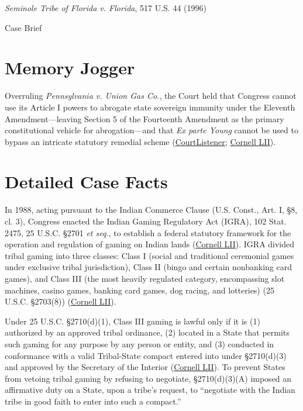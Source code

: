 \documentclass[12pt]{article}
\begin{document}
\begin{center}
{\LARGE \textit{Seminole Tribe of Florida v. Florida}, 517 U.S. 44 (1996)\par}
\vspace{0.8em}
{\large Case Brief\par}
\end{center}
\vspace{1em}

\section{Memory Jogger}

Overruling \textit{Pennsylvania v. Union Gas Co.}, the Court held that Congress cannot use its Article I powers to abrogate state sovereign immunity under the Eleventh Amendment---leaving Section 5 of the Fourteenth Amendment as the primary constitutional vehicle for abrogation---and that \textit{Ex parte Young} cannot be used to bypass an intricate statutory remedial scheme (\href{https://www.courtlistener.com/opinion/118011/seminole-tribe-of-florida-v-florida/}{CourtListener}; \href{https://www.law.cornell.edu/supct/html/94-12.ZO.html}{Cornell LII}).

\section{Detailed Case Facts}

In 1988, acting pursuant to the Indian Commerce Clause (U.S. Const., Art. I, \S 8, cl. 3), Congress enacted the Indian Gaming Regulatory Act (IGRA), 102 Stat. 2475, 25 U.S.C. \S 2701 \textit{et seq.}, to establish a federal statutory framework for the operation and regulation of gaming on Indian lands (\href{https://www.law.cornell.edu/supct/html/94-12.ZO.html}{Cornell LII}). IGRA divided tribal gaming into three classes: Class I (social and traditional ceremonial games under exclusive tribal jurisdiction), Class II (bingo and certain nonbanking card games), and Class III (the most heavily regulated category, encompassing slot machines, casino games, banking card games, dog racing, and lotteries) (25 U.S.C. \S 2703(8)) (\href{https://www.law.cornell.edu/supct/html/94-12.ZO.html}{Cornell LII}).

Under 25 U.S.C. \S 2710(d)(1), Class III gaming is lawful only if it is (1) authorized by an approved tribal ordinance, (2) located in a State that permits such gaming for any purpose by any person or entity, and (3) conducted in conformance with a valid Tribal-State compact entered into under \S 2710(d)(3) and approved by the Secretary of the Interior (\href{https://www.law.cornell.edu/supct/html/94-12.ZO.html}{Cornell LII}). To prevent States from vetoing tribal gaming by refusing to negotiate, \S 2710(d)(3)(A) imposed an affirmative duty on a State, upon a tribe's request, to ``negotiate with the Indian tribe in good faith to enter into such a compact.''
\end{document}

